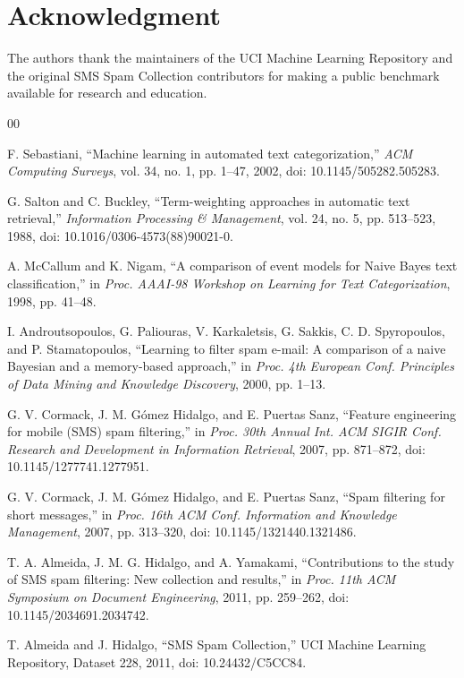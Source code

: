 \documentclass[conference]{IEEEtran}
\begin{document}
\section*{Acknowledgment}
The authors thank the maintainers of the UCI Machine Learning Repository and the original SMS Spam Collection contributors for making a public benchmark available for research and education.

\balance
\begin{thebibliography}{00}

F. Sebastiani, ``Machine learning in automated text categorization,'' \emph{ACM Computing Surveys}, vol. 34, no. 1, pp. 1--47, 2002, doi: 10.1145/505282.505283.

G. Salton and C. Buckley, ``Term-weighting approaches in automatic text retrieval,'' \emph{Information Processing \& Management}, vol. 24, no. 5, pp. 513--523, 1988, doi: 10.1016/0306-4573(88)90021-0.

A. McCallum and K. Nigam, ``A comparison of event models for Naive Bayes text classification,'' in \emph{Proc. AAAI-98 Workshop on Learning for Text Categorization}, 1998, pp. 41--48.

I. Androutsopoulos, G. Paliouras, V. Karkaletsis, G. Sakkis, C. D. Spyropoulos, and P. Stamatopoulos, ``Learning to filter spam e-mail: A comparison of a naive Bayesian and a memory-based approach,'' in \emph{Proc. 4th European Conf. Principles of Data Mining and Knowledge Discovery}, 2000, pp. 1--13.

G. V. Cormack, J. M. G{\'o}mez Hidalgo, and E. Puertas Sanz, ``Feature engineering for mobile (SMS) spam filtering,'' in \emph{Proc. 30th Annual Int. ACM SIGIR Conf. Research and Development in Information Retrieval}, 2007, pp. 871--872, doi: 10.1145/1277741.1277951.

G. V. Cormack, J. M. G{\'o}mez Hidalgo, and E. Puertas Sanz, ``Spam filtering for short messages,'' in \emph{Proc. 16th ACM Conf. Information and Knowledge Management}, 2007, pp. 313--320, doi: 10.1145/1321440.1321486.

T. A. Almeida, J. M. G. Hidalgo, and A. Yamakami, ``Contributions to the study of SMS spam filtering: New collection and results,'' in \emph{Proc. 11th ACM Symposium on Document Engineering}, 2011, pp. 259--262, doi: 10.1145/2034691.2034742.

T. Almeida and J. Hidalgo, ``SMS Spam Collection,'' UCI Machine Learning Repository, Dataset 228, 2011, doi: 10.24432/C5CC84.


\end{thebibliography}
\end{document}
